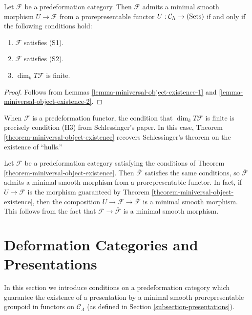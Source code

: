 \begin{theorem}
\label{theorem-miniversal-object-existence}
Let $\mathcal F$ be a predeformation category.  Then $\mathcal F$ admits a 
minimal smooth morphism $U \rightarrow \mathcal F$ from a prorepresentable 
functor $U: \mathcal C_{\Lambda} \rightarrow \textnormal{(Sets)}$ if and only 
if the following conditions hold:
\begin{enumerate}
\item $\mathcal F$ satisfies \textnormal{(S1)}.
\item $\mathcal F$ satisfies \textnormal{(S2)}.
\item $\dim_{k} T\mathcal F$ is finite.
\end{enumerate}
\end{theorem}

\begin{proof}
Follows from Lemmas \ref{lemma-miniversal-object-existence-1} and 
\ref{lemma-miniversal-object-existence-2}.
\end{proof}

\begin{remark}
When $\mathcal F$ is a predeformation functor, the condition that $\dim_{k} 
T\mathcal F$ is finite is precisely condition (H3) from Schlessinger's paper. 
In this case, Theorem \ref{theorem-miniversal-object-existence} recovers 
Schlessinger's theorem on the existence of ``hulls.''
\end{remark}

\begin{remark}
Let $\mathcal F$ be a predeformation category satisfying the conditions of 
Theorem \ref{theorem-miniversal-object-existence}. Then $\overline{\mathcal F}$ 
satisfies the same conditions, so $\mathcal \overline{\mathcal F}$ admits a 
minimal smooth morphism from a prorepresentable functor.  In fact, if $U 
\rightarrow \mathcal F$ is the morphism guaranteed by Theorem 
\ref{theorem-miniversal-object-existence}, then the composition $U \rightarrow 
\mathcal F \rightarrow \overline{\mathcal F}$ is a minimal smooth morphism.  
This follows from the fact that $\mathcal F \rightarrow \overline{\mathcal F}$ 
is a minimal smooth morphism.
\end{remark}


\section{Deformation Categories and Presentations}
\label{section-deformation-groupoids-presentations}
\noindent
In this section we introduce conditions on a predeformation category which 
guarantee the existence of a presentation by a minimal smooth prorepresentable 
groupoid in functors on $\mathcal C_{\Lambda}$ (as defined in Section 
\ref{subsection-presentations}).

